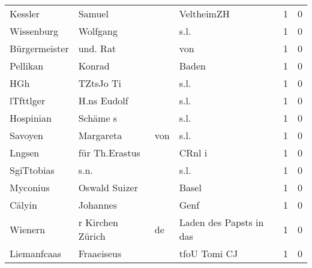 \begin{tabular}{llllrr}
                  Kessler &                             Samuel &             &                                  VeltheimZH &          1 &         0 \\
               Wissenburg &                           Wolfgang &             &                                        s.l. &          1 &         0 \\
            Bürgermeister &                           und. Rat &             &                                         von &          1 &         0 \\
                 Pellikan &                             Konrad &             &                                       Baden &          1 &         0 \\
                      HGh &                          TZtsJo Ti &             &                                        s.l. &          1 &         0 \\
                lTfttlger &                        H.ns Eudolf &             &                                        s.l. &          1 &         0 \\
                Hospinian &                           Schäme s &             &                                        s.l. &          1 &         0 \\
                  Savoyen &                          Margareta &         von &                                        s.l. &          1 &         0 \\
                   Lngsen &                     für Th.Erastus &             &                                      CRnl i &          1 &         0 \\
               SgiTtobias &                               s.n. &             &                                        s.l. &          1 &         0 \\
                 Myconius &                      Oswald Suizer &             &                                       Basel &          1 &         0 \\
                   Cälyin &                           Johannes &             &                                        Genf &          1 &         0 \\
                  Wienern &                   r Kirchen Zürich &          de &                     Laden des Papsts in das &          1 &         0 \\
              Liemanfcaas &                         Fraaeiseus &             &                                tfoU Tomi CJ &          1 &         0 \\

\end{tabular}
